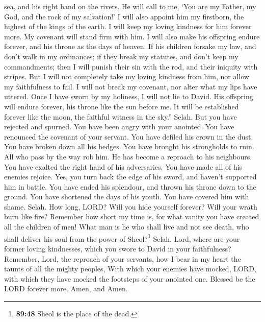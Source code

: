 sea, and his right hand on the rivers.  He will call to
me, `You are my Father, my God, and the rock of my salvation!'
 I will also appoint him my firstborn, the highest of the
kings of the earth.  I will keep my loving kindness for
him forever more. My covenant will stand firm with him. 
I will also make his offspring endure forever, and his throne as the
days of heaven.  If his children forsake my law, and
don't walk in my ordinances;  if they break my statutes,
and don't keep my commandments;  then I will punish their
sin with the rod, and their iniquity with stripes.  But I
will not completely take my loving kindness from him, nor allow my
faithfulness to fail.  I will not break my covenant, nor
alter what my lips have uttered.  Once I have sworn by my
holiness, I will not lie to David.  His offspring will
endure forever, his throne like the sun before me.  It
will be established forever like the moon, the faithful witness in the
sky.'' Selah.  But you have rejected and spurned. You
have been angry with your anointed.  You have renounced
the covenant of your servant. You have defiled his crown in the dust.
 You have broken down all his hedges. You have brought
his strongholds to ruin.  All who pass by the way rob
him. He has become a reproach to his neighbours.  You
have exalted the right hand of his adversaries. You have made all of his
enemies rejoice.  Yes, you turn back the edge of his
sword, and haven't supported him in battle.  You have
ended his splendour, and thrown his throne down to the ground.
 You have shortened the days of his youth. You have
covered him with shame. Selah.  How long, LORD? Will you
hide yourself forever? Will your wrath burn like fire? 
Remember how short my time is, for what vanity you have created all the
children of men!  What man is he who shall live and not
see death, who shall deliver his soul from the power of
Sheol?\footnote{\textbf{89:48} Sheol is the place of the dead.} Selah.
 Lord, where are your former loving kindnesses, which you
swore to David in your faithfulness?  Remember, Lord, the
reproach of your servants, how I bear in my heart the taunts of all the
mighty peoples,  With which your enemies have mocked,
LORD, with which they have mocked the footsteps of your anointed one.
 Blessed be the LORD forever more. Amen, and Amen.

